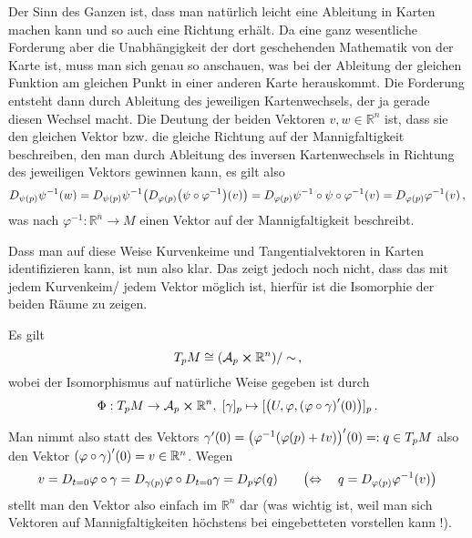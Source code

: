 \documentclass[../H_Analysis_main.tex]{subfiles}
\begin{document}
Der Sinn des Ganzen ist, dass man natürlich leicht eine Ableitung in Karten machen kann und so auch eine Richtung erhält. Da eine ganz wesentliche Forderung aber die Unabhängigkeit der dort geschehenden Mathematik von der Karte ist, muss man sich genau so anschauen, was bei der Ableitung der gleichen Funktion am gleichen Punkt in einer anderen Karte herauskommt. Die Forderung entsteht dann durch Ableitung des jeweiligen Kartenwechsels, der ja gerade diesen Wechsel macht. Die Deutung der beiden Vektoren $v, w \in \mathbb{R}^n$ ist, dass sie den gleichen Vektor bzw. die gleiche Richtung auf der Mannigfaltigkeit beschreiben, den man durch Ableitung des inversen Kartenwechsels in Richtung des jeweiligen Vektors gewinnen kann, es gilt also
\begin{equation*}
%
D_{\psi(p)} \psi^{-1}(w) = D_{\psi(p)} \psi^{-1}\qty(D_{\varphi(p)} \qty(\psi \circ \varphi^{-1})(v)) = D_{\varphi(p)} \psi^{-1} \circ \psi \circ \varphi^{-1}(v) = D_{\varphi(p)} \varphi^{-1}(v) \, ,
\end{equation*}
was nach $\varphi^{-1}: \mathbb{R}^n \rightarrow M$ einen Vektor auf der Mannigfaltigkeit beschreibt.


Dass man auf diese Weise Kurvenkeime und Tangentialvektoren in Karten identifizieren kann, ist nun also klar. Das zeigt jedoch noch nicht, dass das mit jedem Kurvenkeim/ jedem Vektor möglich ist, hierfür ist die Isomorphie der beiden Räume zu zeigen.

\begin{satz}
Es gilt
\begin{equation}
T_p M \cong \qty(\mathcal{A}_p \cross \mathbb{R}^n)/ \sim \, ,
\end{equation}
wobei der Isomorphismus auf natürliche Weise gegeben ist durch
\begin{equation}
\Phi: T_p M \rightarrow \mathcal{A}_p \cross \mathbb{R}^n, \; [\gamma]_p \mapsto [\qty(U, \varphi, \qty(\varphi \circ \gamma)'(0))]_p \, .
\end{equation}
\end{satz}
Man nimmt also statt des Vektors $\gamma'(0) = \qty(\varphi^{-1}(\varphi(p) + t v))'(0) =: q \in T_p M$ also den Vektor $\qty(\varphi \circ \gamma)'(0) = v \in \mathbb{R}^n$. Wegen
\begin{equation*}
v = D_{t = 0} \varphi \circ \gamma = D_{\gamma(p)} \varphi \circ D_{t = 0} \gamma = D_p \varphi(q) \qquad \qty(\Leftrightarrow \quad q = D_{\varphi(p)} \varphi^{-1}(v))
\end{equation*}
stellt man den Vektor also einfach im $\mathbb{R}^n$ dar (was wichtig ist, weil man sich Vektoren auf Mannigfaltigkeiten höchstens bei eingebetteten vorstellen kann !).
\end{document}
